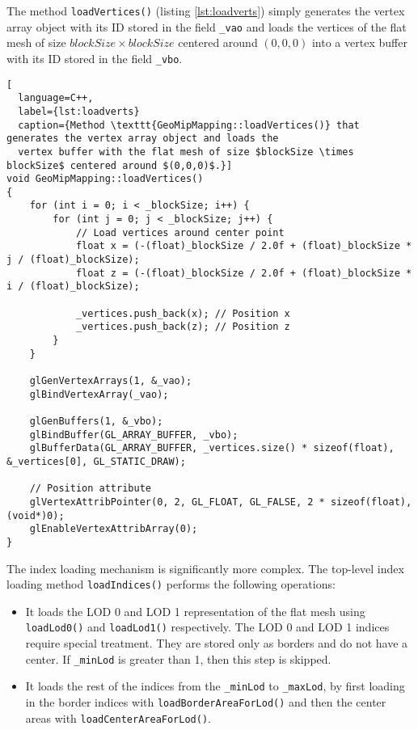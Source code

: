 The method \texttt{loadVertices()} (listing \ref{lst:loadverts}) simply generates the vertex array object with its ID stored in the field \texttt{\_vao}
and loads the vertices of the flat mesh of size $blockSize \times blockSize$
centered around $(0,0,0)$ into a vertex buffer with its ID stored in the field \texttt{\_vbo}.
\begin{lstlisting}[
  language=C++,
  label={lst:loadverts}
  caption={Method \texttt{GeoMipMapping::loadVertices()} that generates the vertex array object and loads the
  vertex buffer with the flat mesh of size $blockSize \times blockSize$ centered around $(0,0,0)$.}]
void GeoMipMapping::loadVertices()
{
    for (int i = 0; i < _blockSize; i++) {
        for (int j = 0; j < _blockSize; j++) {
            // Load vertices around center point 
            float x = (-(float)_blockSize / 2.0f + (float)_blockSize * j / (float)_blockSize);
            float z = (-(float)_blockSize / 2.0f + (float)_blockSize * i / (float)_blockSize);

            _vertices.push_back(x); // Position x 
            _vertices.push_back(z); // Position z 
        }
    }

    glGenVertexArrays(1, &_vao);
    glBindVertexArray(_vao);

    glGenBuffers(1, &_vbo);
    glBindBuffer(GL_ARRAY_BUFFER, _vbo);
    glBufferData(GL_ARRAY_BUFFER, _vertices.size() * sizeof(float), &_vertices[0], GL_STATIC_DRAW);

    // Position attribute
    glVertexAttribPointer(0, 2, GL_FLOAT, GL_FALSE, 2 * sizeof(float), (void*)0);
    glEnableVertexAttribArray(0);
}
\end{lstlisting}

The index loading mechanism is significantly more complex.
The top-level index loading method \texttt{loadIndices()}
performs the following operations:
\begin{itemize}
  \item It loads the LOD 0 and LOD 1 representation of the flat mesh using \texttt{loadLod0()} and \texttt{loadLod1()} respectively. The LOD 0 and LOD 1 indices require special treatment. They are stored only as borders and do not have a center.
        If \texttt{\_minLod} is greater than 1, then this step is skipped.
  \item It loads the rest of the indices from the \texttt{\_minLod} to \texttt{\_maxLod}, by first loading in the border indices with \texttt{loadBorderAreaForLod()}
        and then the center areas with \texttt{loadCenterAreaForLod()}.
\end{itemize}

